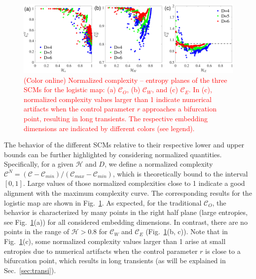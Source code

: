 \documentclass[aip,cha,reprint,nofootinbib]{revtex4-1}
\begin{document}
\begin{figure}
        \centering
        \includegraphics[width=2\columnwidth]{CompEntropyCNormalized_Logistic.pdf}
\caption{\textcolor{red}{(Color online) Normalized complexity -- entropy planes of the three SCMs for the logistic map: (a) $\mathcal{C}_O$, (b) $\mathcal{C}_W$, and (c) $\mathcal{C}_E$. In (c), normalized complexity values larger than 1 indicate numerical artifacts when the control parameter $r$ approaches a bifurcation point, resulting in long transients. The respective embedding dimensions are indicated by different colors (see legend).  \label{fig:CHlogCmax}}}
\end{figure}

{\color{red}The behavior of the different SCMs relative to their respective lower and upper bounds can be further highlighted by considering normalized quantities. Specifically, for a given $\mathcal{H}$ and $D$, we define a normalized complexity $\mathcal{C}^{N} = (\mathcal{C} - \mathcal{C}_{min}) / (\mathcal{C}_{max} - \mathcal{C}_{min})$, which is theoretically bound to the interval $[0,1]$. Large values of those normalized complexities close to 1 indicate a good alignment with the maximum complexity curve. The corresponding results for the logistic map are shown in Fig.~\ref{fig:CHlogCmax}. As expected, for the traditional $\mathcal{C}_{O}$, the behavior is characterized by many points in the right half plane (large entropies, see Fig.~\ref{fig:CHlogCmax}(a)) for all considered embedding dimensions. In contrast, there are no points in the range of $\mathcal{H} >0.8$ for $\mathcal{C}_W$ and $\mathcal{C}_E$ (Fig.~\ref{fig:CHlogCmax}(b, c)). Note that in Fig.~\ref{fig:CHlogCmax}(c), some normalized complexity values larger than 1 arise at small entropies due to numerical artifacts when the control parameter $r$ is close to a bifurcation point, which results in long transients (as will be explained in Sec.~\ref{sec:transi}).}  
\end{document}
